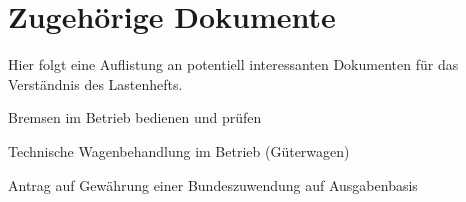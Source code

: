 \section{Zugehörige Dokumente}
Hier folgt eine Auflistung an potentiell interessanten Dokumenten für das Verständnis des Lastenhefts.
\begin{dok}[RIL 915]
Bremsen im Betrieb bedienen und prüfen
\end{dok}
\begin{dok}[RIL 936]
Technische Wagenbehandlung im Betrieb (Güterwagen)
\end{dok}
\begin{dok}[AZAP]
Antrag  auf  Gewährung  einer  Bundeszuwendung  auf  Ausgabenbasis
\end{dok}
